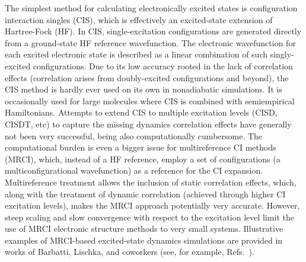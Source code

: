 \documentclass[9pt,bestpractices]{livecoms}
\begin{document}
The simplest method for calculating electronically excited states is configuration interaction singles (CIS), which is effectively an excited-state extension of Hartree-Fock (HF). In CIS, single-excitation configurations are generated directly from a ground-state HF reference wavefunction.\cite{DH05} The electronic wavefunction for each excited electronic state is described as a linear combination of such singly-excited configurations. Due to its low accuracy rooted in the lack of correlation effects (correlation arises from doubly-excited configurations and beyond), the CIS method is hardly ever used on its own in nonadiabatic simulations. It is occasionally used for large molecules where CIS is combined with semiempirical Hamiltonians.\cite{nelson2014nonadiabatic} 
Attempts to extend CIS to multiple excitation levels (CISD, CISDT, etc) to capture the missing dynamics correlation effects have generally not been very successful,\cite{gonzalez2012progress} being also computationally cumbersome. The computational burden is even a bigger issue for multireference CI methods (MRCI), which, instead of a HF reference, employ a set of configurations (a multiconfigurational wavefunction) as a reference for the CI expansion. Multireference treatment allows the inclusion of static correlation effects, which, along with the treatment of dynamic correlation (achieved through higher CI excitation levels), makes the MRCI approach potentially very accurate.\cite{lischka2018multireference} However, steep scaling and slow convergence with respect to the excitation level limit the use of MRCI electronic structure methods to very small systems. Illustrative examples of MRCI-based excited-state dynamics simulations are provided in works of Barbatti, Lischka, and coworkers (see, for example, Refs.~\cite{vazdar2009excited,szymczak2008mechanism}).
\end{document}
